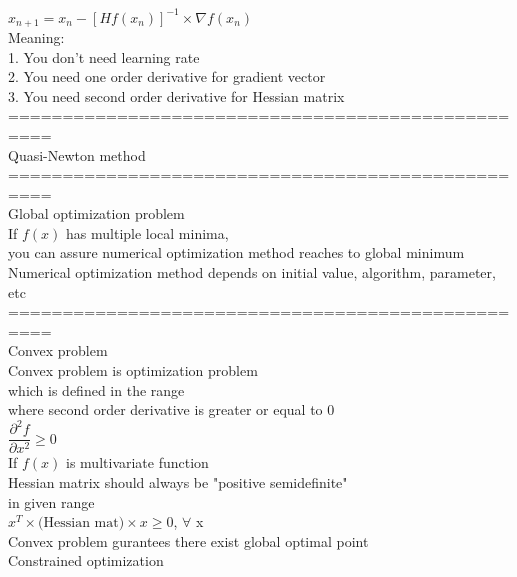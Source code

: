 \documentclass{article}
\begin{document}
${x}_{n+1} = {x}_n - [{H}f({x}_n)]^{-1} \times \nabla f({x}_n)$ \\ 

Meaning: \\ 
1. You don't need learning rate \\ 
2. You need one order derivative for gradient vector \\ 
3. You need second order derivative for Hessian matrix \\ 

==================================================\\
Quasi-Newton method \\ 

==================================================\\
Global optimization problem \\ 
If $f(x)$ has multiple local minima, \\ 
you can assure numerical optimization method reaches to global minimum \\

Numerical optimization method depends on initial value, algorithm, parameter, etc \\ 

==================================================\\
Convex problem \\ 
Convex problem is optimization problem \\
which is defined in the range\\
where second order derivative is greater or equal to 0 \\ 

$\dfrac{\partial^2 f}{\partial x^2} \ge 0$ \\

If $f(x)$ is multivariate function \\ 
Hessian matrix should always be "positive semidefinite" \\ 
in given range \\ 

$x^T \times \text{(Hessian mat)} \times x \ge 0$, $\forall$ x \\ 

Convex problem gurantees there exist global optimal point \\ 





Constrained optimization \\ 
\end{document}
